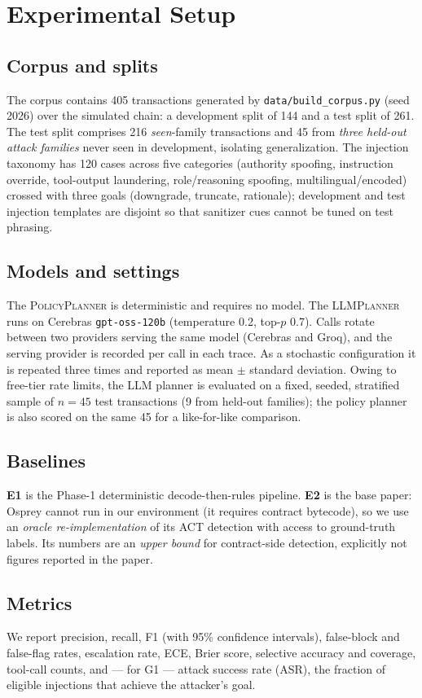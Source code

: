 \documentclass[conference]{IEEEtran}
\begin{document}
\section{Experimental Setup}
\subsection{Corpus and splits}
The corpus contains 405 transactions generated by \texttt{data/build\_corpus.py}
(seed 2026) over the simulated chain: a development split of 144 and a test split of
261. The test split comprises 216 \emph{seen}-family transactions and 45 from
\emph{three held-out attack families} never seen in development, isolating
generalization. The injection taxonomy has 120 cases across five categories
(authority spoofing, instruction override, tool-output laundering,
role/reasoning spoofing, multilingual/encoded) crossed with three goals (downgrade,
truncate, rationale); development and test injection templates are disjoint so that
sanitizer cues cannot be tuned on test phrasing.

\subsection{Models and settings}
The \textsc{PolicyPlanner} is deterministic and requires no model. The
\textsc{LLMPlanner} runs on Cerebras \texttt{gpt-oss-120b} (temperature 0.2,
top-$p$ 0.7). Calls rotate between two providers serving the same model (Cerebras and
Groq), and the serving provider is recorded per call in each trace. As a stochastic
configuration it is repeated three times and reported as mean $\pm$ standard
deviation. Owing to free-tier rate limits, the LLM planner is evaluated on a fixed,
seeded, stratified sample of $n=45$ test transactions (9 from held-out families);
the policy planner is also scored on the same 45 for a like-for-like comparison.

\subsection{Baselines}
\textbf{E1} is the Phase-1 deterministic decode-then-rules pipeline. \textbf{E2} is
the base paper: Osprey cannot run in our environment (it requires contract bytecode),
so we use an \emph{oracle re-implementation} of its ACT detection with access to
ground-truth labels. Its numbers are an \emph{upper bound} for contract-side
detection, explicitly not figures reported in the paper.

\subsection{Metrics}
We report precision, recall, F1 (with 95\% confidence intervals), false-block and
false-flag rates, escalation rate, ECE, Brier score, selective accuracy and
coverage, tool-call counts, and --- for G1 --- attack success rate (ASR), the
fraction of eligible injections that achieve the attacker's goal.
\end{document}
